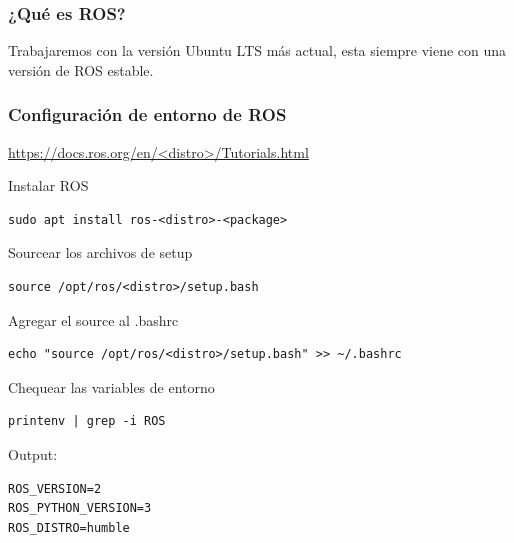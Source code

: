 \begin{frame}
	\frametitle{¿Qué es ROS?}
	  Trabajaremos con la versión Ubuntu LTS más actual, esta siempre viene con una versión de ROS estable.
	
	\begin{figure}[!h]
		\centering
	\end{figure}

\end{frame}

\begin{frame}[fragile]
	\frametitle{Configuración de entorno de ROS}
    
    \href{https://docs.ros.org/en/<distro>/Tutorials.html}{https://docs.ros.org/en/<distro>/Tutorials.html}
    
Instalar ROS
\begin{lstlisting}[style=bash]
sudo apt install ros-<distro>-<package>
\end{lstlisting}

Sourcear los archivos de setup
\begin{lstlisting}[style=bash]
source /opt/ros/<distro>/setup.bash
\end{lstlisting}
    
Agregar el source al .bashrc
\begin{lstlisting}[style=bash]
echo "source /opt/ros/<distro>/setup.bash" >> ~/.bashrc
\end{lstlisting}

Chequear las variables de entorno
\begin{lstlisting}[style=bash]
printenv | grep -i ROS
\end{lstlisting}

Output:
\begin{lstlisting}[style=bash]
ROS_VERSION=2
ROS_PYTHON_VERSION=3
ROS_DISTRO=humble
\end{lstlisting}	
\end{frame}

